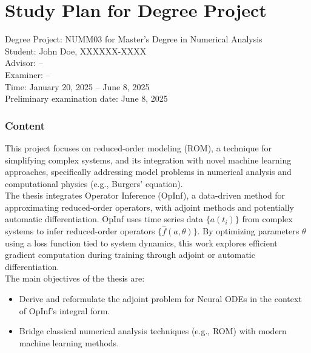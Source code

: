 \documentclass[en,cm,10pt]{inst}
\begin{document}
	\section*{Study Plan for Degree Project}
	Degree Project: NUMM03 for Master's Degree in Numerical Analysis \\
	Student: John Doe, XXXXXX-XXXX\\
	Advisor: --\\
	Examiner: --\\ 
	Time:  January 20, 2025 -- June 8, 2025\\
    Preliminary examination date: June 8, 2025
	
	\subsubsection*{Content}
	This project focuses on reduced-order modeling (ROM), a technique for simplifying complex systems, and its integration with novel machine learning approaches, specifically addressing model problems in numerical analysis and computational physics (e.g., Burgers' equation).\\
    
    \noindent The thesis integrates Operator Inference (OpInf), a data-driven method for approximating reduced-order operators, with adjoint methods and potentially automatic differentiation. OpInf uses time series data $\{a(t_i)\}$ from complex systems to infer reduced-order operators $\{\hat{f}(a, \theta)\}$. By optimizing parameters $\theta$ using a loss function tied to system dynamics, this work explores efficient gradient computation during training through adjoint or automatic differentiation.\\

    The main objectives of the thesis are:
    \begin{itemize}
        \item Derive and reformulate the adjoint problem for Neural ODEs in the context of OpInf's integral form.
        \item Bridge classical numerical analysis techniques (e.g., ROM) with modern machine learning methods.
    \end{itemize}
	
\end{document}
